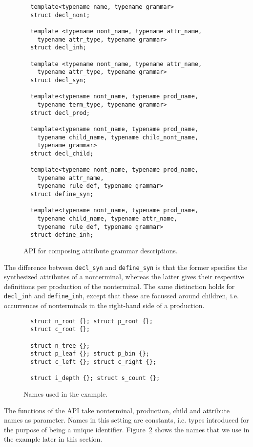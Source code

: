 \documentclass{llncs}
\begin{document}
  \begin{figure}[ht]
  \begin{lstlisting}
  template<typename name, typename grammar>
  struct decl_nont;

  template <typename nont_name, typename attr_name,
    typename attr_type, typename grammar>
  struct decl_inh;

  template <typename nont_name, typename attr_name,
    typename attr_type, typename grammar>
  struct decl_syn;

  template<typename nont_name, typename prod_name,
    typename term_type, typename grammar>
  struct decl_prod;

  template<typename nont_name, typename prod_name,
    typename child_name, typename child_nont_name,
    typename grammar>
  struct decl_child;

  template<typename nont_name, typename prod_name,
    typename attr_name,
    typename rule_def, typename grammar>
  struct define_syn;

  template<typename nont_name, typename prod_name,
    typename child_name, typename attr_name,
    typename rule_def, typename grammar>
  struct define_inh;
  \end{lstlisting}
  \caption{API for composing attribute grammar descriptions.}
  \label{fig:api}
  \end{figure}

  The difference between \lstinline$decl_syn$ and \lstinline$define_syn$
  is that the former specifies the synthesized attributes of a nonterminal,
  whereas the latter gives their respective definitions per production of the
  nonterminal. The same distinction holds for \lstinline$decl_inh$ and
  \lstinline$define_inh$, except that these are focussed around
  children, i.e. occurrences of nonterminals in the right-hand side of a
  production.

  \begin{figure}[tb]
  \begin{lstlisting}
  struct n_root {}; struct p_root {};
  struct c_root {};

  struct n_tree {};
  struct p_leaf {}; struct p_bin {};
  struct c_left {}; struct c_right {};

  struct i_depth {}; struct s_count {};
  \end{lstlisting}
  \caption{Names used in the example.}
  \label{fig:idents}
  \end{figure}

  The functions of the API take nonterminal, production,
  child and attribute names as parameter. Names in this
  setting are constants, i.e.
  types introduced for the purpose of being a unique
  identifier. Figure~\ref{fig:idents} shows the names that
  we use in the example later in this section.
\end{document}
